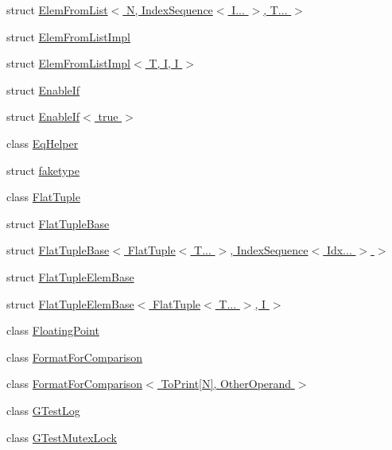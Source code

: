 \begin{DoxyCompactItemize}
\item 
struct \hyperlink{structtesting_1_1internal_1_1ElemFromList_3_01N_00_01IndexSequence_3_01I_8_8_8_01_4_00_01T_8_8_8_01_4}{Elem\+From\+List$<$ N, Index\+Sequence$<$ I... $>$, T... $>$}
\item 
struct \hyperlink{structtesting_1_1internal_1_1ElemFromListImpl}{Elem\+From\+List\+Impl}
\item 
struct \hyperlink{structtesting_1_1internal_1_1ElemFromListImpl_3_01T_00_01I_00_01I_01_4}{Elem\+From\+List\+Impl$<$ T, I, I $>$}
\item 
struct \hyperlink{structtesting_1_1internal_1_1EnableIf}{Enable\+If}
\item 
struct \hyperlink{structtesting_1_1internal_1_1EnableIf_3_01true_01_4}{Enable\+If$<$ true $>$}
\item 
class \hyperlink{classtesting_1_1internal_1_1EqHelper}{Eq\+Helper}
\item 
struct \hyperlink{structtesting_1_1internal_1_1faketype}{faketype}
\item 
class \hyperlink{classtesting_1_1internal_1_1FlatTuple}{Flat\+Tuple}
\item 
struct \hyperlink{structtesting_1_1internal_1_1FlatTupleBase}{Flat\+Tuple\+Base}
\item 
struct \hyperlink{structtesting_1_1internal_1_1FlatTupleBase_3_01FlatTuple_3_01T_8_8_8_01_4_00_01IndexSequence_3_01Idx_8_8_8_01_4_01_4}{Flat\+Tuple\+Base$<$ Flat\+Tuple$<$ T... $>$, Index\+Sequence$<$ Idx... $>$ $>$}
\item 
struct \hyperlink{structtesting_1_1internal_1_1FlatTupleElemBase}{Flat\+Tuple\+Elem\+Base}
\item 
struct \hyperlink{structtesting_1_1internal_1_1FlatTupleElemBase_3_01FlatTuple_3_01T_8_8_8_01_4_00_01I_01_4}{Flat\+Tuple\+Elem\+Base$<$ Flat\+Tuple$<$ T... $>$, I $>$}
\item 
class \hyperlink{classtesting_1_1internal_1_1FloatingPoint}{Floating\+Point}
\item 
class \hyperlink{classtesting_1_1internal_1_1FormatForComparison}{Format\+For\+Comparison}
\item 
class \hyperlink{classtesting_1_1internal_1_1FormatForComparison_3_01ToPrint[N]_00_01OtherOperand_01_4}{Format\+For\+Comparison$<$ To\+Print\mbox{[}\+N\mbox{]}, Other\+Operand $>$}
\item 
class \hyperlink{classtesting_1_1internal_1_1GTestLog}{G\+Test\+Log}
\item 
class \hyperlink{classtesting_1_1internal_1_1GTestMutexLock}{G\+Test\+Mutex\+Lock}

\end{DoxyCompactItemize}
